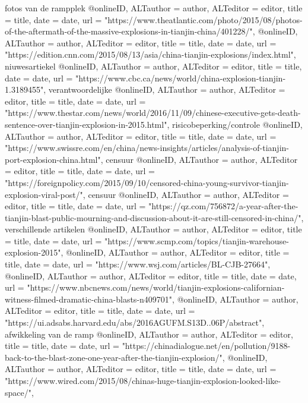 {{{{{{{{{{{{{fotos van de rampplek
@online{ID,	ALTauthor = {author},	ALTeditor = {editor},	title = {title},	date = {date},	url = {"https://www.theatlantic.com/photo/2015/08/photos-of-the-aftermath-of-the-massive-explosions-in-tianjin-china/401228/"},}
@online{ID,	ALTauthor = {author},	ALTeditor = {editor},	title = {title},	date = {date},	url = {"https://edition.cnn.com/2015/08/13/asia/china-tianjin-explosions/index.html"},}
niuwesartiekel}
@online{ID,	ALTauthor = {author},	ALTeditor = {editor},	title = {title},	date = {date},	url = {"https://www.cbc.ca/news/world/china-explosion-tianjin-1.3189455"},}
verantwoordelijke
@online{ID,	ALTauthor = {author},	ALTeditor = {editor},	title = {title},	date = {date},	url = {"https://www.thestar.com/news/world/2016/11/09/chinese-executive-gets-death-sentence-over-tianjin-explosion-in-2015.html"},}
risicobeperking/controle
@online{ID,	ALTauthor = {author},	ALTeditor = {editor},	title = {title},	date = {date},	url = {"https://www.swissre.com/en/china/news-insights/articles/analysis-of-tianjin-port-explosion-china.html"},}
censuur
@online{ID,	ALTauthor = {author},	ALTeditor = {editor},	title = {title},	date = {date},	url = {"https://foreignpolicy.com/2015/09/10/censored-china-young-survivor-tianjin-explosion-viral-post/"},}
censuur
@online{ID,	ALTauthor = {author},	ALTeditor = {editor},	title = {title},	date = {date},	url = {"https://qz.com/756872/a-year-after-the-tianjin-blast-public-mourning-and-discussion-about-it-are-still-censored-in-china/"},}
verschillende artikelen
@online{ID,	ALTauthor = {author},	ALTeditor = {editor},	title = {title},	date = {date},	url = {"https://www.scmp.com/topics/tianjin-warehouse-explosion-2015"},}
@online{ID,	ALTauthor = {author},	ALTeditor = {editor},	title = {title},	date = {date},	url = {"https://www.wsj.com/articles/BL-CJB-27664"},}
@online{ID,	ALTauthor = {author},	ALTeditor = {editor},	title = {title},	date = {date},	url = {"https://www.nbcnews.com/news/world/tianjin-explosions-californian-witness-filmed-dramatic-china-blasts-n409701"},}
@online{ID,	ALTauthor = {author},	ALTeditor = {editor},	title = {title},	date = {date},	url = {"https://ui.adsabs.harvard.edu/abs/2016AGUFM.S13D..06P/abstract"},}
afwikkeling van de ramp
@online{ID,	ALTauthor = {author},	ALTeditor = {editor},	title = {title},	date = {date},	url = {"https://chinadialogue.net/en/pollution/9188-back-to-the-blast-zone-one-year-after-the-tianjin-explosion/"},}
@online{ID,	ALTauthor = {author},	ALTeditor = {editor},	title = {title},	date = {date},	url = {"https://www.wired.com/2015/08/chinas-huge-tianjin-explosion-looked-like-space/"},}
}}}}}}}}}}}}
